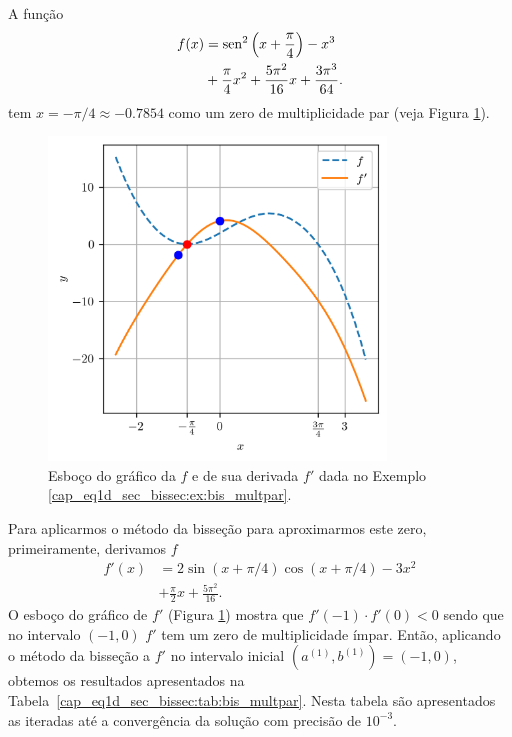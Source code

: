 \begin{ex}\label{cap_eq1d_sec_bissec:ex:bis_multpar}
  A função
  \begin{equation}
    \begin{aligned}
      f(x) &= \operatorname{sen}^2\left(x+\frac{\pi}{4}\right) - x^3 \\
           &+ \frac{\pi}{4}x^2 + \frac{5\pi^2}{16}x + \frac{3\pi^3}{64}.
    \end{aligned}
\end{equation}
tem $x=-\pi/4\approx -0.7854$ como um zero de multiplicidade par (veja Figura \ref{cap_eq1d_sec_bissec:fig:bis_multpar}).

\begin{figure}[H]
  \centering
  \includegraphics[width=0.8\textwidth]{./cap_eq1d/dados/fig_bis_multpar/fig}
  \caption{Esboço do gráfico da $f$ e de sua derivada $f'$ dada no Exemplo \ref{cap_eq1d_sec_bissec:ex:bis_multpar}.}
  \label{cap_eq1d_sec_bissec:fig:bis_multpar}
\end{figure}

Para aplicarmos o método da bisseção para aproximarmos este zero, primeiramente, derivamos $f$
\begin{equation}
  \begin{aligned}
    f'(x) &= 2\sin(x+\pi/4)\cos(x+\pi/4) - 3x^2 \\
          &+ \frac{\pi}{2}x + \frac{5\pi^2}{16}.
  \end{aligned}
\end{equation}
O esboço do gráfico de $f'$ (Figura \ref{cap_eq1d_sec_bissec:fig:bis_multpar}) mostra que $f'(-1)\cdot f'(0) < 0$ sendo que no intervalo $(-1, 0)$ $f'$ tem um zero de multiplicidade ímpar. Então, aplicando o método da bisseção a $f'$ no intervalo inicial $(a^{(1)}, b^{(1)}) = (-1, 0)$, obtemos os resultados apresentados na Tabela~\ref{cap_eq1d_sec_bissec:tab:bis_multpar}. Nesta tabela são apresentados as iteradas até a convergência da solução com precisão de $10^{-3}$.


\end{ex}
